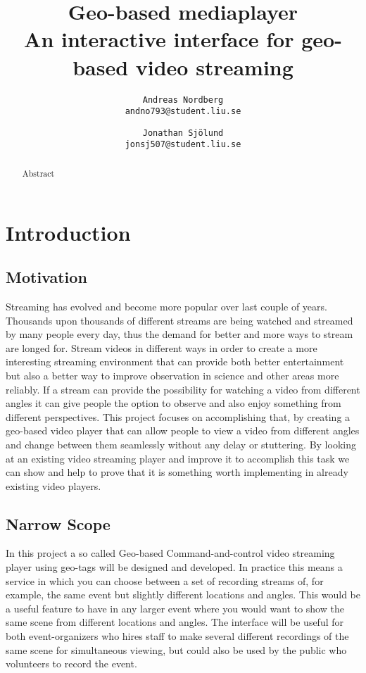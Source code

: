 \documentclass[9pt,a4paper]{acmproc}
\author{
\texttt{Andreas Nordberg}\\
\texttt{andno793@student.liu.se}
  \and
  \texttt{Jonathan Sjölund}\\
  \texttt{jonsj507@student.liu.se}
}
\begin{document}

\title{%
	Geo-based mediaplayer \\
	\large An interactive interface for geo-based video streaming}
\maketitle

\begin{abstract}
Abstract

\end{abstract}


\section{Introduction} 

\subsection{Motivation}
Streaming has evolved and become more popular over last couple of years. Thousands upon thousands of different streams are being watched and streamed by many people every day, thus the demand for better and more ways to stream are longed for. Stream videos in different ways in order to create a more interesting streaming environment that can provide both better entertainment but also a better way to improve observation in science and other areas more reliably. If a stream can provide the possibility for watching a video from different angles it can give people the option to observe and also enjoy something from different perspectives. This project focuses on accomplishing that, by creating a geo-based video player that can allow people to view a video from different angles and change between them seamlessly without any delay or stuttering. By looking at an existing video streaming player and improve it to accomplish this task we can show and help to prove that it is something worth implementing in already existing video players.

\subsection{Narrow Scope}
In this project a so called Geo-based Command-and-control video streaming player using geo-tags will be designed and developed. In practice this means a service in which you can choose between a set of recording streams of, for example, the same event but slightly different locations and angles. This would be a useful feature to have in any larger event where you would want to show the same scene from different locations and angles. The interface will be useful for both event-organizers who hires staff to make several different recordings of the same scene for simultaneous viewing, but could also be used by the public who volunteers to record the event.
\end{document}
